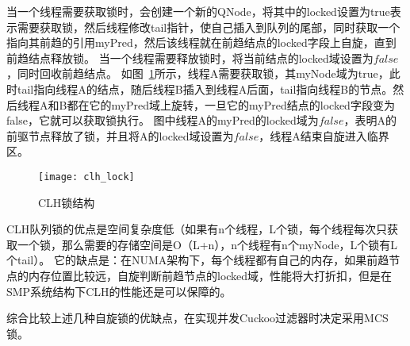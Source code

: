 当一个线程需要获取锁时，会创建一个新的QNode，将其中的locked设置为true表示需要获取锁，然后线程修改tail指针，使自己插入到队列的尾部，同时获取一个指向其前趋的引用myPred，然后该线程就在前趋结点的locked字段上自旋，直到前趋结点释放锁。
当一个线程需要释放锁时，将当前结点的locked域设置为$false$，同时回收前趋结点。
如图~\ref{fig:clh_lock}所示，线程A需要获取锁，其myNode域为true，此时tail指向线程A的结点，随后线程B插入到线程A后面，tail指向线程B的节点。然后线程A和B都在它的myPred域上旋转，一旦它的myPred结点的locked字段变为false，它就可以获取锁执行。
图中线程A的myPred的locked域为$false$，表明A的前驱节点释放了锁，并且将A的locked域设置为$false$，线程A结束自旋进入临界区。

\begin{figure}[htbp]
\centering
\texttt{[image: clh\_lock]}
\caption{CLH锁结构}
\label{fig:clh_lock}
\end{figure}


CLH队列锁的优点是空间复杂度低（如果有n个线程，L个锁，每个线程每次只获取一个锁，那么需要的存储空间是O（L+n），n个线程有n个myNode，L个锁有L个tail）。
它的缺点是：在NUMA架构下，每个线程都有自己的内存，如果前趋节点的内存位置比较远，自旋判断前趋节点的locked域，性能将大打折扣，但是在SMP系统结构下CLH的性能还是可以保障的。

综合比较上述几种自旋锁的优缺点，在实现并发Cuckoo过滤器时决定采用MCS锁。

